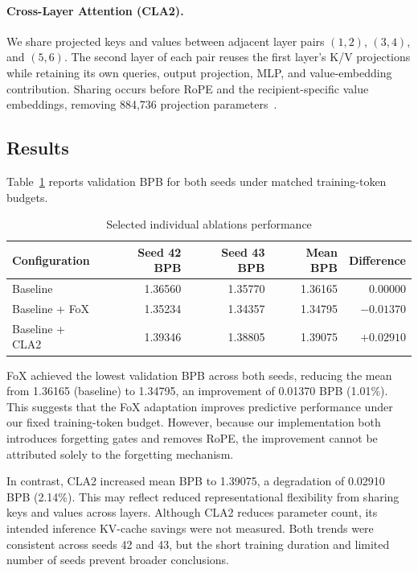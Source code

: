 \documentclass[11pt]{article}
\begin{document}
\paragraph{Cross-Layer Attention (CLA2).}
We share projected keys and values between adjacent layer
pairs $(1,2)$, $(3,4)$, and $(5,6)$. The second layer of each
pair reuses the first layer's K/V projections while retaining
its own queries, output projection, MLP, and value-embedding
contribution. Sharing occurs before RoPE and the
recipient-specific value embeddings, removing 884,736
projection parameters~\cite{cla}.


\subsection{Results}
Table~\ref{tab:selected-ablations} reports validation BPB
for both seeds under matched training-token budgets.
\begin{table}[htbp]
\centering
\small
\begin{tabular}{lrrrr}
\hline
Configuration & Seed 42 BPB & Seed 43 BPB & Mean BPB & Difference\\
\hline
Baseline & 1.36560 & 1.35770 & 1.36165 & $0.00000$\\
Baseline + FoX & 1.35234 & 1.34357 & 1.34795 & $-0.01370$\\
Baseline + CLA2 & 1.39346 & 1.38805 & 1.39075 & $+0.02910$\\
\hline
\end{tabular}
\caption{Selected individual ablations performance}
\label{tab:selected-ablations}
\end{table}

FoX achieved the lowest validation BPB across both seeds,
reducing the mean from 1.36165 (baseline) to 1.34795,
an improvement of 0.01370 BPB (1.01\%). This suggests
that the FoX adaptation improves predictive performance
under our fixed training-token budget. However, because
our implementation both introduces forgetting gates and
removes RoPE, the improvement cannot be attributed solely
to the forgetting mechanism.

In contrast, CLA2 increased mean BPB to 1.39075, a
degradation of 0.02910 BPB (2.14\%). This may reflect
reduced representational flexibility from sharing
keys and values across layers. Although CLA2 reduces
parameter count, its intended inference KV-cache
savings were not measured. Both trends were consistent
across seeds 42 and 43, but the short training duration
and limited number of seeds prevent broader conclusions.
\end{document}
